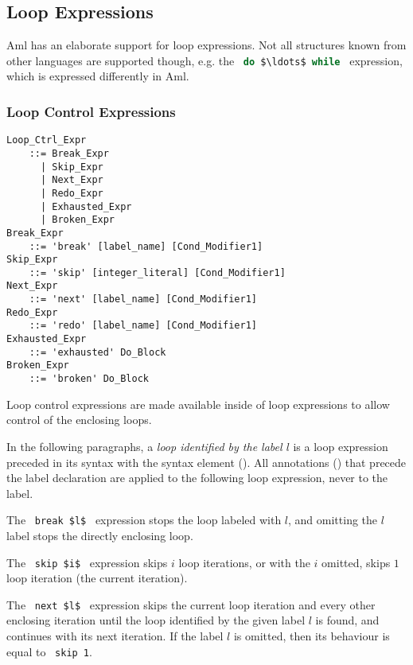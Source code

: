 \subsection{Loop Expressions}

Aml has an elaborate support for loop expressions. Not all structures known from other languages are supported though, e.g. the ~\lstinline[language=Java]!do $\ldots$ while!~ expression, which is expressed differently in Aml. 






\subsubsection{Loop Control Expressions}
\label{sec:loop-control-expressions}

\grammar\begin{lstlisting}
Loop_Ctrl_Expr 
    ::= Break_Expr
      | Skip_Expr
      | Next_Expr
      | Redo_Expr
      | Exhausted_Expr
      | Broken_Expr
Break_Expr 
    ::= 'break' [label_name] [Cond_Modifier1]
Skip_Expr
    ::= 'skip' [integer_literal] [Cond_Modifier1]
Next_Expr
    ::= 'next' [label_name] [Cond_Modifier1]
Redo_Expr 
    ::= 'redo' [label_name] [Cond_Modifier1]
Exhausted_Expr 
    ::= 'exhausted' Do_Block
Broken_Expr
    ::= 'broken' Do_Block
\end{lstlisting}

Loop control expressions are made available inside of loop expressions to allow control of the enclosing loops.

In the following paragraphs, a {\em loop identified by the label $l$} is a loop expression preceded in its syntax with the syntax element  (). All annotations () that precede the label declaration are applied to the following loop expression, never to the label. 

The ~\lstinline!break $l$!~ expression stops the loop labeled with $l$, and omitting the $l$ label stops the directly enclosing loop. 

The ~\lstinline!skip $i$!~ expression skips $i$ loop iterations, or with the $i$ omitted, skips $1$ loop iteration (the current iteration). 

The ~\lstinline!next $l$!~ expression skips the current loop iteration and every other enclosing iteration until the loop identified by the given label $l$ is found, and continues with its next iteration. If the label $l$ is omitted, then its behaviour is equal to ~\lstinline!skip 1!. 

